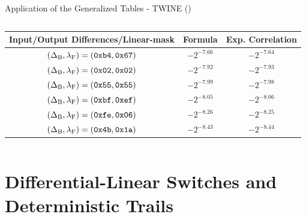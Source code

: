 \begin{frame}{Application of the Generalized \dlct Tables - TWINE ({\scriptsize\protect\dlfeistellegend})}
\begin{columns}
{\begin{tabular}{ccc}
  \toprule
  Input/Output Differences/Linear-mask & Formula & Exp. Correlation\\
  \midrule
  $(\Delta_{\textrm{B}}, \lambda_{\textrm{F}}) = (\texttt{0xb4}, \texttt{0x67})$ & $-2^{-7.66}$ & $-2^{-7.64}$ \\
  $(\Delta_{\textrm{B}}, \lambda_{\textrm{F}}) = (\texttt{0x02}, \texttt{0x02})$ & $-2^{-7.92}$ & $-2^{-7.93}$ \\
  $(\Delta_{\textrm{B}}, \lambda_{\textrm{F}}) = (\texttt{0x55}, \texttt{0x55})$ & $-2^{-7.99}$ & $-2^{-7.98}$ \\
  $(\Delta_{\textrm{B}}, \lambda_{\textrm{F}}) = (\texttt{0xbf}, \texttt{0xef})$ & $-2^{-8.05}$ & $-2^{-8.06}$ \\
  $(\Delta_{\textrm{B}}, \lambda_{\textrm{F}}) = (\texttt{0xfe}, \texttt{0x06})$ & $-2^{-8.26}$ & $-2^{-8.25}$ \\
  $(\Delta_{\textrm{B}}, \lambda_{\textrm{F}}) = (\texttt{0x4b}, \texttt{0x1a})$ & $-2^{-8.43}$ & $-2^{-8.44}$ \\
  \bottomrule
\end{tabular}
}
\end{columns}
\end{frame}

\section*{Differential-Linear Switches and Deterministic Trails}

